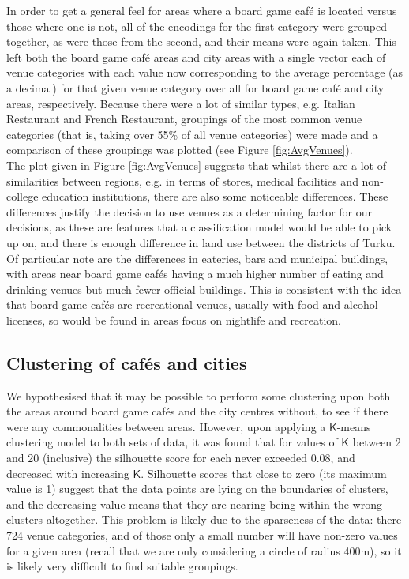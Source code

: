 \documentclass{article}
\begin{document}
    In order to get a general feel for areas where a board game caf\'e is located versus those where one is not, all of the encodings for the first category were grouped together, as were those from the second, and their means were again taken. 
    This left both the board game caf\'e areas and city areas with a single vector each of venue categories with each value now corresponding to the average percentage (as a decimal) for that given venue category over all for board game caf\'e and city areas, respectively.
    Because there were a lot of similar types, e.g. Italian Restaurant and French Restaurant, groupings of the most common venue categories (that is, taking over 55\% of all venue categories) were made and a comparison of these groupings was plotted (see Figure \ref{fig:AvgVenues}).\\

    The plot given in Figure \ref{fig:AvgVenues} suggests that whilst there are a lot of similarities between regions, e.g. in terms of stores, medical facilities and non-college education institutions, there are also some noticeable differences.
    These differences justify the decision to use venues as a determining factor for our decisions, as these are features that a classification model would be able to pick up on, and there is enough difference in land use between the districts of Turku.
    Of particular note are the differences in eateries, bars and municipal buildings, with areas near board game caf\'es having a much higher number of eating and drinking venues but much fewer official buildings.
    This is consistent with the idea that board game caf\'es are recreational venues, usually with food and alcohol licenses, so would be found in areas focus on nightlife and recreation.

    \subsection{Clustering of caf\'es and cities}

    We hypothesised that it may be possible to perform some clustering upon both the areas around board game caf\'es and the city centres without, to see if there were any commonalities between areas.
    However, upon applying a $\mathsf{K}$-means clustering model to both sets of data, it was found that for values of $\mathsf{K}$ between 2 and 20 (inclusive) the silhouette score for each never exceeded 0.08, and decreased with increasing $\mathsf{K}$. 
    Silhouette scores that close to zero (its maximum value is 1) suggest that the data points are lying on the boundaries of clusters, and the decreasing value means that they are nearing being within the wrong clusters altogether.
    This problem is likely due to the sparseness of the data: there 724 venue categories, and of those only a small number will have non-zero values for a given area (recall that we are only considering a circle of radius 400m), so it is likely very difficult to find suitable groupings.
\end{document}
